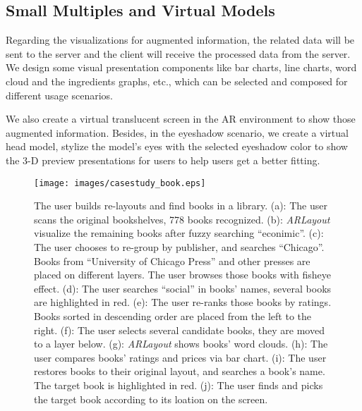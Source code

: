 \subsection{Small Multiples and Virtual Models}

Regarding the visualizations for augmented information,
the related data will be sent to the server and the client will
receive the processed data from the server.
We design some visual presentation components like bar charts, line charts,
word cloud and the ingredients graphs, etc.,
which can be selected and composed for different usage scenarios.

We also create a virtual translucent screen in the AR environment to
show those augmented information.
Besides, in the eyeshadow scenario, we create a virtual head model,
stylize the model's eyes with the selected eyeshadow color
to show the 3-D preview presentations for users to help users
get a better fitting.


\begin{figure*}[htb]
    \centering
    \texttt{[image: images/casestudy\_book.eps]}
    \caption{
        The user builds re-layouts and find books in a library.
        (a): The user scans the original bookshelves, 778 books recognized.
        (b): \textit{ARLayout} visualize the remaining books after fuzzy searching ``econimic''.
        (c): The user chooses to re-group by publisher, and searches ``Chicago''.
        Books from ``University of Chicago Press'' and other presses are placed on different layers.
        The user browses those books with fisheye effect.
        (d): The user searches ``social'' in books' names, several books are highlighted in red.
        (e): The user re-ranks those books by ratings. Books sorted
        in descending order are placed from the left to the right.
        (f): The user selects several candidate books, they are moved to a layer below.
        (g): \textit{ARLayout} shows books' word clouds.
        (h): The user compares books' ratings and prices via bar chart.
        (i): The user restores books to their original layout,
        and searches a book's name. The target book is highlighted in red.
        (j): The user finds and picks the target book according to its loation on the screen.
    }
    \label{fig:casestudy_book}
\end{figure*}

